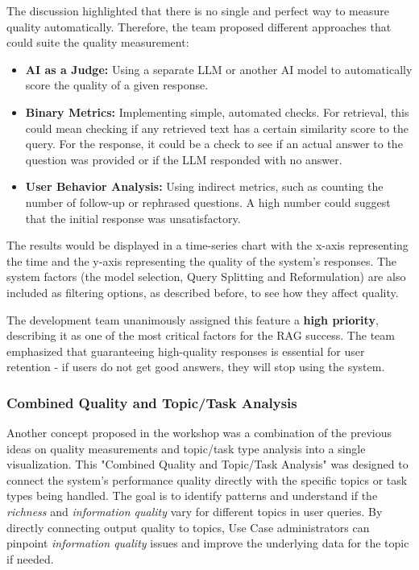 \documentclass[
	english,
	ruledheaders=section,%
	class=report,%
	thesis={type=bachelor},%
	accentcolor=1b,%
	custommargins=true,%
	marginpar=false,%
	parskip=half-,%
	fontsize=11pt,%
	DIV=14,
]{tudapub}
\begin{document}
The discussion highlighted that there is no single and perfect way to measure quality automatically. Therefore, the team proposed different approaches that could suite the quality measurement:

\begin{itemize}
    \item \textbf{AI as a Judge:} Using a separate LLM or another AI model to automatically score the quality of a given response.
    \item \textbf{Binary Metrics:} Implementing simple, automated checks. For retrieval, this could mean checking if any retrieved text has a certain similarity score to the query. For the response, it could be a check to see if an actual answer to the question was provided or if the LLM responded with no answer.
    \item \textbf{User Behavior Analysis:} Using indirect metrics, such as counting the number of follow-up or rephrased questions. A high number could suggest that the initial response was unsatisfactory.
\end{itemize}

The results would be displayed in a time-series chart with the x-axis representing the time and the y-axis representing the quality of the system's responses. The system factors (the model selection, Query Splitting and Reformulation) are also included as filtering options, as described before, to see how they affect quality.

The development team unanimously assigned this feature a \textbf{high priority}, describing it as one of the most critical factors for the RAG success. The team emphasized that guaranteeing high-quality responses is essential for user retention - if users do not get good answers, they will stop using the system.
\subsubsection{Combined Quality and Topic/Task Analysis}
Another concept proposed in the workshop was a combination of the previous ideas on quality measurements and topic/task type analysis into a single visualization. This "Combined Quality and Topic/Task Analysis" was designed to connect the system's performance quality directly with the specific topics or task types being handled. The goal is to identify patterns and understand if the \textit{richness} and \textit{information quality} \parencite[pp.~57--58]{DeloneMcLean2003ISSuccessTenYearUpdate} vary for different topics in user queries. By directly connecting output quality to topics, Use Case administrators can pinpoint \textit{information quality} issues and improve the underlying data for the topic if needed.
\end{document}
